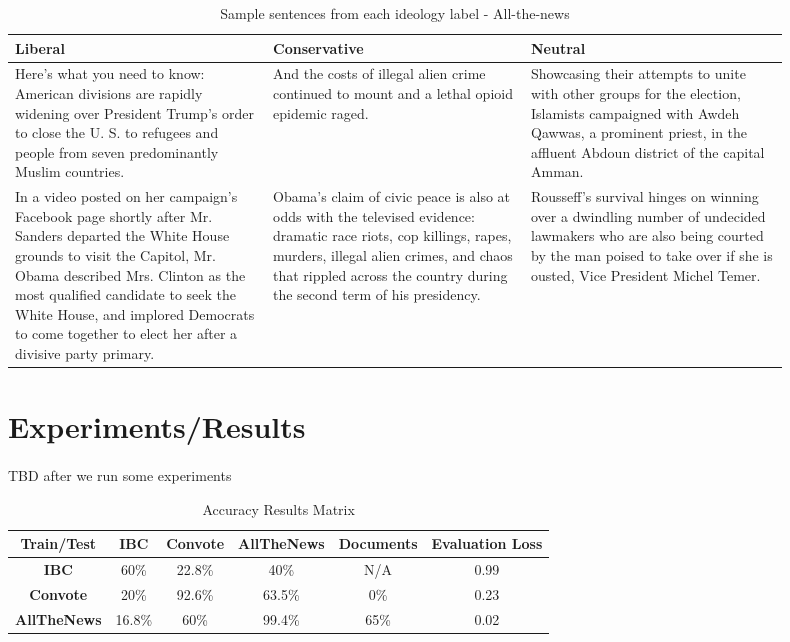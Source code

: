 \documentclass[10pt,a4paper,onecolumn]{article}
\begin{document}
\begin{table}[h!]
	\begin{center}
		\caption{Sample sentences from each ideology label - All-the-news	}
		\label{tab:atn-sentences}
		\begin{tabular}{p{0.3\linewidth}|p{0.3\linewidth}|p{0.3\linewidth}}
			\hline\hline
			\textbf{Liberal} & \textbf{Conservative} & \textbf{Neutral}\\
			\hline
			Here’s what you need to know: American divisions are rapidly widening over President Trump’s order to close the U. S. to refugees and people from seven predominantly Muslim countries. & And the costs of illegal alien crime continued to mount and a lethal opioid epidemic raged. & Showcasing their attempts to unite with other groups for the election, Islamists campaigned with Awdeh Qawwas, a prominent priest, in the affluent Abdoun district of the capital Amman. \\
			In a video posted on her campaign’s Facebook page shortly after Mr. Sanders departed the White House grounds to visit the Capitol, Mr. Obama described Mrs. Clinton as the most qualified candidate to seek the White House, and implored Democrats to come together to elect her after a divisive party primary. & Obama’s claim of civic peace is also at odds with the televised evidence: dramatic race riots, cop killings, rapes, murders, illegal alien crimes, and chaos that rippled across the country during the second term of his presidency. & Rousseff’s survival hinges on winning over a dwindling number of undecided lawmakers who are also being courted by the man poised to take over if she is ousted, Vice President Michel Temer. \\
			\hline\hline
		\end{tabular}
	\end{center}
\end{table}

\section{Experiments/Results}
\paragraph{}
TBD after we run some experiments

\begin{table}[h!]
\centering
\caption{Accuracy Results Matrix}
\begin{tabular}{c||c|c|c|c||c} 
 \hline
 \textbf{Train/Test} & \textbf{IBC} & \textbf{Convote} & \textbf{AllTheNews} & \textbf{Documents} & \textbf{Evaluation Loss} \\ [0.5ex] 
 \hline\hline
 \textbf{IBC} & 60\% & 22.8\% & 40\% & N/A & 0.99 \\ 
 \textbf{Convote} & 20\% & 92.6\% & 63.5\% & 0\% & 0.23\\
 \textbf{AllTheNews} & 16.8\% & 60\% & 99.4\% & 65\% & 0.02 \\ [1ex]
 \hline
\end{tabular}
\label{table:results}
\end{table}
\end{document}
